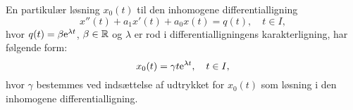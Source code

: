 \begin{method} \label{saet.difflig2.eksprod1}
En partikulær løsning $ x_0(t) $ til den inhomogene differentialligning
\begin{equation}
x''(t) + a_1x'(t) + a_0x(t) = q(t), \quad t \in I,
\end{equation}
hvor $ q(t) = \beta \mathrm{e}^{\lambda t} $, $ \beta \in \mathbb{R} $ og $ \lambda $ er rod i differentialligningens karakterligning, har følgende form:
\begin{equation}
x_0(t) = \gamma t \mathrm{e}^{\lambda t}, \quad t \in I,
\end{equation}
hvor $ \gamma $ bestemmes ved indsættelse af udtrykket for $ x_0(t) $ som løsning i den inhomogene differentialligning.
\end{method}

